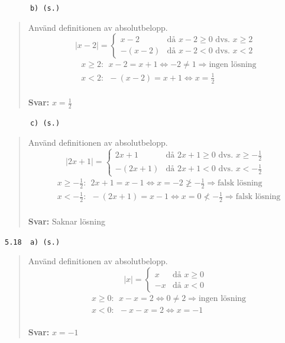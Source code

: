 \documentclass[a4paper]{article}
\newcommand{\tskcol}[1]{\textcolor{tskcol}{#1}}
\begin{document}
	\texttt{\tskcol{~~~~~~b) (s.)}}
	\begin{quotation}
		\noindent
		Använd definitionen av absolutbelopp.
		\[|x-2|=
		\begin{cases}
		x-2&    \text{då } x-2 \ge 0 \text{ dvs. } x \ge 2\\
		-(x-2)& \text{då } x-2 < 0   \text{ dvs. } x < 2
		\end{cases}\]
		\begin{align*}
		& x \ge 2:~~ x-2 = x+1 \Leftrightarrow -2 \neq 1 \Rightarrow\text{ingen lösning}\\
		& x < 2:~~ -(x-2) = x+1 \Leftrightarrow x = \frac{1}{2}
		\end{align*}
		\\ 
		\textbf{Svar:} $x=\frac{1}{2}$
	\end{quotation}
	
	\texttt{\tskcol{~~~~~~c) (s.)}}
	\begin{quotation}
		\noindent
		Använd definitionen av absolutbelopp.
		\[|2x+1|=
		\begin{cases}
		2x+1&    \text{då } 2x+1 \ge 0 \text{ dvs. } x \ge -\frac{1}{2}\\
		-(2x+1)& \text{då } 2x+1 < 0   \text{ dvs. } x < -\frac{1}{2}
		\end{cases}\]
		\begin{align*}
		& x \ge -\frac{1}{2}:~~ 2x+1 = x-1 \Leftrightarrow x = -2 \not\ge -\frac{1}{2} \Rightarrow\text{falsk lösning}\\
		& x < -\frac{1}{2}:~~ -(2x+1) = x-1 \Leftrightarrow x = 0 \not< -\frac{1}{2} \Rightarrow\text{falsk lösning}	
		\end{align*}
		\\ 
		\textbf{Svar:} Saknar lösning
	\end{quotation}
	
	\texttt{\tskcol{5.18~~a) (s.)}}
	\begin{quotation}
		\noindent
		Använd definitionen av absolutbelopp.
		\[|x|=
		\begin{cases}
		x& \text{då } x \ge 0 \\
		-x& \text{då } x < 0
		\end{cases}\]
		\begin{align*}
		& x \ge 0:~~ x-x = 2 \Leftrightarrow 0 \neq 2 \Rightarrow\text{ingen lösning}\\
		& x < 0:~~ -x-x = 2 \Leftrightarrow x = -1
		\end{align*}
		\\ 
		\textbf{Svar:} $x=-1$
	\end{quotation}
	
\end{document}
